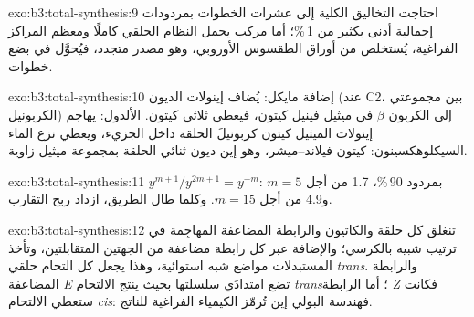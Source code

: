 \begin{solution}{exo:b3:total-synthesis:9}
احتاجت التخاليق الكلية إلى عشرات الخطوات بمردودات إجمالية أدنى بكثير من 1\,\%؛ أما
مركب يحمل النظام الحلقي كاملًا ومعظم المراكز الفراغية، يُستخلص من
أوراق الطقسوس الأوروبي، وهو مصدر متجدد، فيُحوَّل في بضع خطوات.
\end{solution}

\begin{solution}{exo:b3:total-synthesis:10}
إضافة مايكل: يُضاف إينولات الديون (عند C2، بين مجموعتي الكربونيل) إلى
الكربون $\beta$ في ميثيل فينيل كيتون، فيعطي ثلاثي كيتون. الألدول: يهاجم إينولات
الميثيل كيتون كربونيلَ الحلقة داخل الجزيء، ويعطي نزع الماء
السيكلوهكسينون: كيتون فيلاند--ميشر، وهو إين ديون ثنائي الحلقة بمجموعة ميثيل
زاوية.
\end{solution}

\begin{solution}{exo:b3:total-synthesis:11}
$y^{m+1}/y^{2m+1} = y^{-m}$: بمردود 90\,\%، 1.7 من أجل $m = 5$ و4.9 من أجل $m = 15$. وكلما طال الطريق، ازداد
ربح التقارب.
\end{solution}

\begin{solution}{exo:b3:total-synthesis:12}
تنغلق كل حلقة والكاتيون والرابطة المضاعفة المهاجِمة في ترتيب شبيه
بالكرسي؛ والإضافة عبر كل رابطة مضاعفة من الجهتين المتقابلتين، وتأخذ المستبدلات
مواضع شبه استوائية، وهذا يجعل كل التحام حلقي \textit{trans}. والرابطة المضاعفة \textit{E}
تضع امتدادَي سلسلتها بحيث ينتج الالتحام \textit{trans}؛ أما الرابطة \textit{Z} فكانت ستعطي
الالتحام \textit{cis}: فهندسة البولي إين تُرمّز الكيمياء الفراغية
للناتج.
\end{solution}

